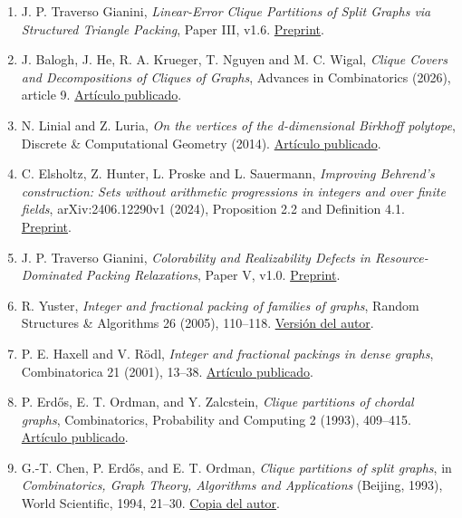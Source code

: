 \documentclass[spanish,11pt,a4paper]{article}
\begin{document}
\begin{enumerate}
\def\labelenumi{\arabic{enumi}.}
\item
  J. P. Traverso Gianini, \emph{Linear-Error Clique Partitions of Split Graphs via Structured Triangle Packing}, Paper III, v1.6. \href{https://github.com/jtraverso/erdos-81-chordal-clique-partitions/tree/3cbd90eed41af7e86ac6f1f4b8c796e20a5e661f/preprints/PAPER_III}{Preprint}.
\item
  J. Balogh, J. He, R. A. Krueger, T. Nguyen and M. C. Wigal, \emph{Clique Covers and Decompositions of Cliques of Graphs}, Advances in Combinatorics (2026), article 9. \href{https://doi.org/10.19086/aic/2026.9}{Artículo publicado}.
\item
  N. Linial and Z. Luria, \emph{On the vertices of the d-dimensional Birkhoff polytope}, Discrete \& Computational Geometry (2014). \href{https://doi.org/10.1007/s00454-013-9554-5}{Artículo publicado}.
\item
  C. Elsholtz, Z. Hunter, L. Proske and L. Sauermann, \emph{Improving Behrend's construction: Sets without arithmetic progressions in integers and over finite fields}, arXiv:2406.12290v1 (2024), Proposition 2.2 and Definition 4.1. \href{https://arxiv.org/html/2406.12290v1}{Preprint}.
\item
  J. P. Traverso Gianini, \emph{Colorability and Realizability Defects in Resource-Dominated Packing Relaxations}, Paper V, v1.0. \href{https://github.com/jtraverso/erdos-81-chordal-clique-partitions/tree/3cbd90eed41af7e86ac6f1f4b8c796e20a5e661f/preprints/PAPER_V}{Preprint}.
\item
  R. Yuster, \emph{Integer and fractional packing of families of graphs}, Random Structures \& Algorithms 26 (2005), 110--118. \href{https://math.haifa.ac.il/raphy/papers/fracpack.pdf}{Versión del autor}.
\item
  P. E. Haxell and V. Rödl, \emph{Integer and fractional packings in dense graphs}, Combinatorica 21 (2001), 13--38. \href{https://doi.org/10.1007/s004930170003}{Artículo publicado}.
\item
  P. Erdős, E. T. Ordman, and Y. Zalcstein, \emph{Clique partitions of chordal graphs}, Combinatorics, Probability and Computing 2 (1993), 409--415. \href{https://doi.org/10.1017/S0963548300000808}{Artículo publicado}.
\item
  G.-T. Chen, P. Erdős, and E. T. Ordman, \emph{Clique partitions of split graphs}, in \emph{Combinatorics, Graph Theory, Algorithms and Applications} (Beijing, 1993), World Scientific, 1994, 21--30. \href{https://ordman.net/MathResearch/CEOClique_Parts.pdf}{Copia del autor}.

\end{enumerate}
\end{document}
